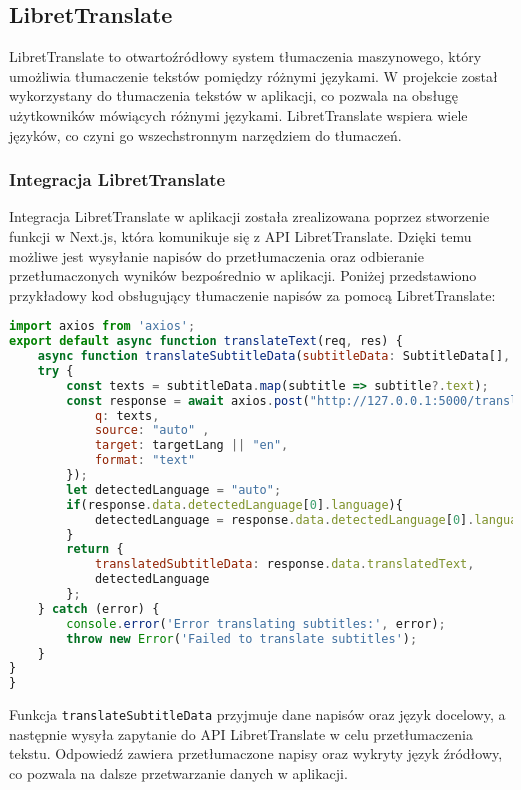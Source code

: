 \subsection{LibretTranslate}
LibretTranslate to otwartoźródłowy system tłumaczenia maszynowego, który umożliwia tłumaczenie tekstów pomiędzy różnymi językami. W projekcie został wykorzystany do tłumaczenia tekstów w aplikacji, co pozwala na obsługę użytkowników mówiących różnymi językami. LibretTranslate wspiera wiele języków, co czyni go wszechstronnym narzędziem do tłumaczeń.

\subsubsection{Integracja LibretTranslate}
Integracja LibretTranslate w aplikacji została zrealizowana poprzez stworzenie funkcji w Next.js, która komunikuje się z API LibretTranslate. Dzięki temu możliwe jest wysyłanie napisów do przetłumaczenia oraz odbieranie przetłumaczonych wyników bezpośrednio w aplikacji. Poniżej przedstawiono przykładowy kod obsługujący tłumaczenie napisów za pomocą LibretTranslate:

\begin{lstlisting}[language=JavaScript, caption=Przykładowy kod integracji LibretTranslate w Next.js]
import axios from 'axios';
export default async function translateText(req, res) {
    async function translateSubtitleData(subtitleData: SubtitleData[], targetLang: string) {
    try {
        const texts = subtitleData.map(subtitle => subtitle?.text);
        const response = await axios.post("http://127.0.0.1:5000/translate", {
            q: texts,
            source: "auto" ,
            target: targetLang || "en",
            format: "text"
        });
        let detectedLanguage = "auto";
        if(response.data.detectedLanguage[0].language){
            detectedLanguage = response.data.detectedLanguage[0].language;
        }
        return {
            translatedSubtitleData: response.data.translatedText,
            detectedLanguage
        };
    } catch (error) {
        console.error('Error translating subtitles:', error);
        throw new Error('Failed to translate subtitles');
    }
}
}
\end{lstlisting}

Funkcja \texttt{translateSubtitleData} przyjmuje dane napisów oraz język docelowy, a następnie wysyła zapytanie do API LibretTranslate w celu przetłumaczenia tekstu. Odpowiedź zawiera przetłumaczone napisy oraz wykryty język źródłowy, co pozwala na dalsze przetwarzanie danych w aplikacji.